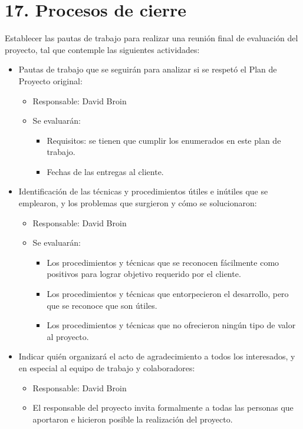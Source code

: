 \documentclass[11pt]{charter}
\begin{document}
\section{17. Procesos de cierre}    
\label{sec:cierre}

Establecer las pautas de trabajo para realizar una reunión final de evaluación del proyecto, tal que contemple las 
siguientes actividades:

\begin{itemize}
\item Pautas de trabajo que se seguirán para analizar si se respetó el Plan de Proyecto original:
\begin{itemize}
  \item Responsable: David Broin
  \item Se evaluarán:
  \begin{itemize}
    \item Requisitos: se tienen que cumplir los enumerados en este plan de trabajo.
    \item Fechas de las entregas al cliente. 
  \end{itemize}
\end{itemize}
\item Identificación de las técnicas y procedimientos útiles e inútiles que se emplearon, y los problemas que surgieron 
y cómo se solucionaron:
\begin{itemize}
  \item Responsable: David Broin
  \item Se evaluarán:
  \begin{itemize}
    \item Los procedimientos y técnicas que se reconocen fácilmente como positivos para lograr objetivo requerido 
    por el cliente.
    \item Los procedimientos y técnicas que entorpecieron el desarrollo, pero que se reconoce que son útiles.
    \item Los procedimientos y técnicas que no ofrecieron ningún tipo de valor al proyecto.
  \end{itemize}
\end{itemize}
\item Indicar quién organizará el acto de agradecimiento a todos los interesados, y en especial al equipo de trabajo 
y colaboradores:
  \begin{itemize}
    \item Responsable: David Broin
    \item El responsable del proyecto invita formalmente a todas las personas que aportaron e hicieron posible 
    la realización del proyecto.
  \end{itemize}
\end{itemize}
\end{document}
